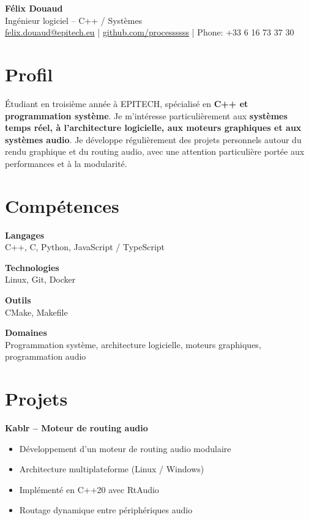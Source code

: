 \documentclass[11pt,a4paper]{article}
\begin{document}
\begin{center}
{\LARGE \textbf{Félix Douaud}} \\[4pt]
Ingénieur logiciel -- C++ / Systèmes \\[6pt]
\href{mailto:felix.douaud@gmail.com}{felix.douaud@epitech.eu} \quad | \quad
\href{https://github.com/processssss}{github.com/processssss} \quad | \quad
Phone: +33 6 16 73 37 30
\end{center}

\vspace{6pt}

\section*{Profil}

Étudiant en troisième année à EPITECH, spécialisé en \textbf{C++ et programmation système}.  
Je m’intéresse particulièrement aux \textbf{systèmes temps réel, à l’architecture logicielle, aux moteurs graphiques et aux systèmes audio}.  
Je développe régulièrement des projets personnels autour du rendu graphique et du routing audio, avec une attention particulière portée aux performances et à la modularité.

\section*{Compétences}

\textbf{Langages} \\
C++, C, Python, JavaScript / TypeScript

\textbf{Technologies} \\
Linux, Git, Docker

\textbf{Outils} \\
CMake, Makefile

\textbf{Domaines} \\
Programmation système, architecture logicielle, moteurs graphiques, programmation audio

\section*{Projets}

\textbf{Kablr -- Moteur de routing audio}

\begin{itemize}
\item Développement d’un moteur de routing audio modulaire
\item Architecture multiplateforme (Linux / Windows)
\item Implémenté en C++20 avec RtAudio
\item Routage dynamique entre périphériques audio
\end{itemize}
\end{document}
